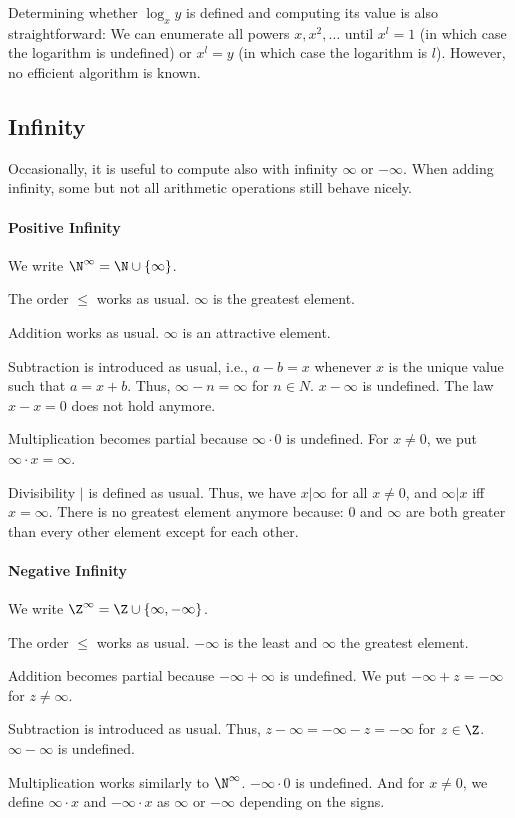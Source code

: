 Determining whether $\log_x y$ is defined and computing its value is also straightforward: We can enumerate all powers $x,x^2,\ldots$ until $x^l=1$ (in which case the logarithm is undefined) or $x^l=y$ (in which case the logarithm is $l$).
However, no efficient algorithm is known.

\subsection{Infinity}\label{sec:math:infty}

Occasionally, it is useful to compute also with infinity $\infty$ or $-\infty$.
When adding infinity, some but not all arithmetic operations still behave nicely.

\paragraph{Positive Infinity}
We write $\N^\infty=\N\cup\{\infty\}$.

The order $\leq$ works as usual.
$\infty$ is the greatest element.

Addition works as usual.
$\infty$ is an attractive element.

Subtraction is introduced as usual, i.e., $a-b=x$ whenever $x$ is the unique value such that $a=x+b$.
Thus, $\infty-n=\infty$ for $n\in N$.
$x-\infty$ is undefined.
The law $x-x=0$ does not hold anymore.

Multiplication becomes partial because $\infty\cdot 0$ is undefined.
For $x\neq 0$, we put $\infty\cdot x=\infty$.

Divisibility $|$ is defined as usual.
Thus, we have $x|\infty$ for all $x\neq 0$, and $\infty|x$ iff $x=\infty$.
There is no greatest element anymore because: $0$ and $\infty$ are both greater than every other element except for each other.

\paragraph{Negative Infinity}
We write $\Z^\infty=\Z\cup\{\infty,-\infty\}$.

The order $\leq$ works as usual.
$-\infty$ is the least and $\infty$ the greatest element.

Addition becomes partial because $-\infty+\infty$ is undefined.
We put $-\infty+z=-\infty$ for $z\neq\infty$.

Subtraction is introduced as usual.
Thus, $z-\infty=-\infty-z=-\infty$ for $z\in \Z$.
$\infty-\infty$ is undefined.

Multiplication works similarly to $\N^\infty$.
$-\infty\cdot 0$ is undefined.
And for $x\neq 0$, we define $\infty\cdot x$ and $-\infty\cdot x$ as $\infty$ or $-\infty$ depending on the signs.

